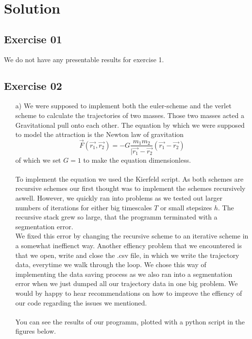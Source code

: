 \section{Solution}
\label{sec:solution}
\subsection{Exercise 01}
We do not have any presentable results for exercise 1.
\subsection{Exercise 02}

\begin{itemize}
    \item[a)]
    We were supposed to implement both the euler-scheme and the verlet scheme to calculate the trajectories of two masses.
    Those two masses acted a Gravitational pull onto each other.
    The equation by which we were supposed to model the attraction is the Newton law of gravitation 
    \begin{equation}
        \vec{F}(\vec{r_1}, \vec{r_2}) = -G \frac{m_1 m_2}{|\vec{r_1} - \vec{r_2}} (\vec{r_1} - \vec{r_2})
    \end{equation}
    of which we set $G=1$ to make the equation dimensionless.\\\\
    To implement the equation we used the Kierfeld script.
    As both schemes are recursive schemes our first thought was to implement the schemes recursively aswell.
    However, we quickly ran into problems as we tested out larger numbers of iterations for either big timescales $T$ or small stepsizes $h$.
    The recursive stack grew so large, that the programm terminated with a segmentation error.\\
    We fixed this error by changing the recursive scheme to an iterative scheme in a somewhat ineffienct way.
    Another effiency problem that we encountered is that we open, write and close the .csv file, in which we write the trajectory data, everytime we walk through the loop.
    We chose this way of implementing the data saving process as we also ran into a segmentation error when we just dumped all our trajectory data in one big problem.
    We would by happy to hear recommendations on how to improve the effiency of our code regarding the issues we mentioned.\\\\
    You can see the results of our programm, plotted with a python script in the figures below.

\end{itemize}
